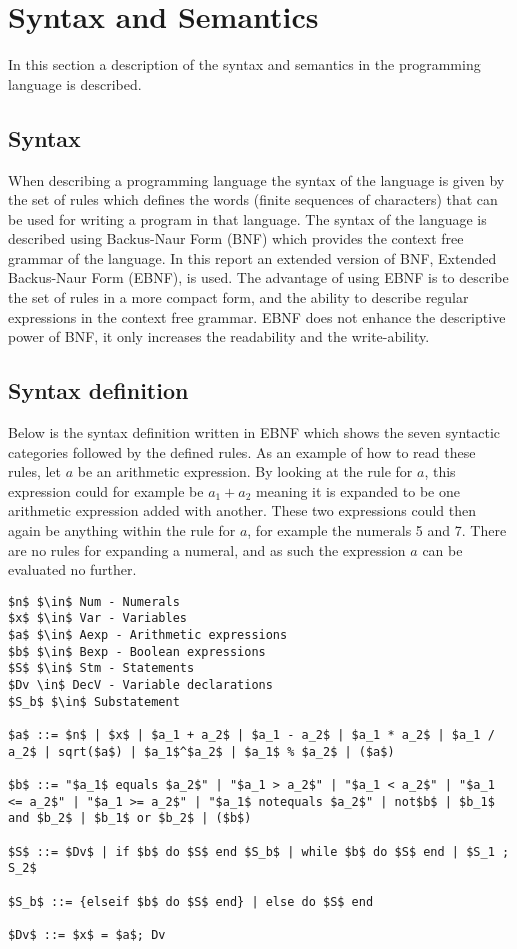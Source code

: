 \chapter{Syntax and Semantics}\label{analysis:syntax-and-semantics}
In this section a description of the syntax and semantics in the programming language is described.

\section{Syntax}
When describing a programming language the syntax of the language is given by the set of rules which defines the words (finite sequences of characters) that can be used for writing a program in that language. The syntax of the language is described using Backus-Naur Form (BNF) which provides the context free grammar of the language.
In this report an extended version of BNF, Extended Backus-Naur Form (EBNF), is used. The advantage of using EBNF is to describe the set of rules in a more compact form, and the ability to describe regular expressions in the context free grammar. EBNF does not enhance the descriptive power of BNF, it only increases the readability and the write-ability.

\section{Syntax definition}\label{sec:anlysis:syntax-definition}
Below is the syntax definition written in EBNF which shows the seven syntactic categories followed by the defined rules. As an example of how to read these rules, let $a$ be an arithmetic expression. By looking at the rule for $a$, this expression could for example be $a_1 + a_2$ meaning it is expanded to be one arithmetic expression added with another. These two expressions could then again be anything within the rule for $a$, for example the numerals 5 and 7. There are no rules for expanding a numeral, and as such the expression $a$ can be evaluated no further.
\begin{lstlisting}[mathescape, captionpos=b, caption={Syntax formation rules}, label={lst:syntax-formation}]
$n$ $\in$ Num - Numerals
$x$ $\in$ Var - Variables
$a$ $\in$ Aexp - Arithmetic expressions
$b$ $\in$ Bexp - Boolean expressions
$S$ $\in$ Stm - Statements
$Dv \in$ DecV - Variable declarations
$S_b$ $\in$ Substatement

$a$ ::= $n$ | $x$ | $a_1 + a_2$ | $a_1 - a_2$ | $a_1 * a_2$ | $a_1 / a_2$ | sqrt($a$) | $a_1$^$a_2$ | $a_1$ % $a_2$ | ($a$)

$b$ ::= "$a_1$ equals $a_2$" | "$a_1 > a_2$" | "$a_1 < a_2$" | "$a_1 <= a_2$" | "$a_1 >= a_2$" | "$a_1$ notequals $a_2$" | not$b$ | $b_1$ and $b_2$ | $b_1$ or $b_2$ | ($b$)

$S$ ::= $Dv$ | if $b$ do $S$ end $S_b$ | while $b$ do $S$ end | $S_1 ; S_2$

$S_b$ ::= {elseif $b$ do $S$ end} | else do $S$ end

$Dv$ ::= $x$ = $a$; Dv
\end{lstlisting}

